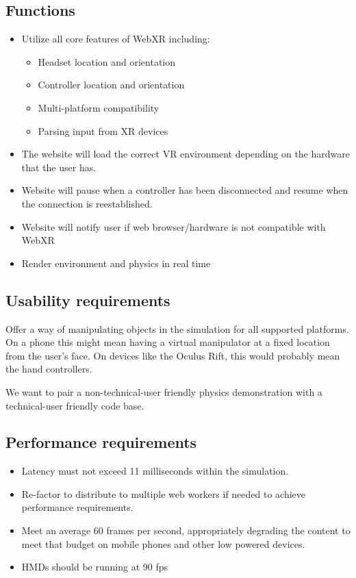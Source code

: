 \subsection{Functions}
\begin{itemize}
    \item Utilize all core features of WebXR including:
    \begin{itemize}
        \item Headset location and orientation
        \item Controller location and orientation
        \item Multi-platform compatibility
        \item Parsing input from XR devices
    \end{itemize}
    \item The website will load the correct VR environment depending on the hardware that the user has.
    \item Website will pause when a controller has been disconnected and resume when the connection is reestablished.
    \item Website will notify user if web browser/hardware is not compatible with WebXR
    \item Render environment and physics in real time
\end{itemize}
\subsection{Usability requirements}
Offer a way of manipulating objects in the simulation for all supported platforms.  On a phone this might mean having a virtual manipulator at a fixed location from the user's face. On devices like the Oculus Rift, this would probably mean the hand controllers.

We want to pair a non-technical-user friendly physics demonstration with a technical-user friendly code base.

\subsection{Performance requirements}
\begin{itemize}
    \item Latency must not exceed 11 milliseconds within the simulation.
    \item Re-factor to distribute to multiple web workers if needed to achieve performance requirements.
    \item Meet an average 60 frames per second, appropriately degrading the content to meet that budget on mobile phones and other low powered devices.
    \item HMDs should be running at 90 fps
\end{itemize}
